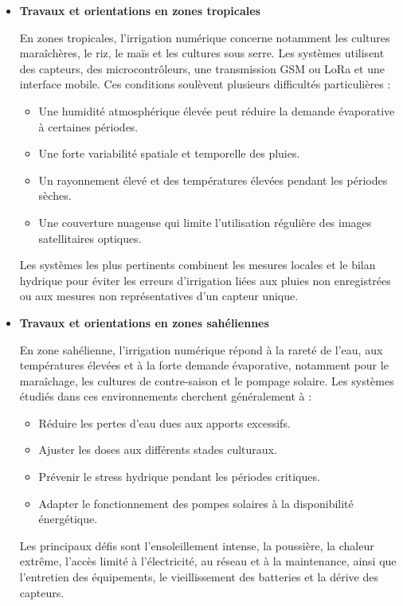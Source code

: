 \begin{itemize}[label=$\bullet$]
   	\item \textbf{Travaux et orientations en zones tropicales}

En zones tropicales, l’irrigation numérique concerne notamment les cultures maraîchères, le riz, le maïs et les cultures sous serre. Les systèmes utilisent des capteurs, des microcontrôleurs, une transmission GSM ou LoRa et une interface mobile. Ces conditions soulèvent plusieurs difficultés particulières : 

    \begin{itemize}[label=$\circ$]
  	  \item Une humidité atmosphérique élevée peut réduire la demande évaporative à certaines périodes.
  	
  	  \item Une forte variabilité spatiale et temporelle des pluies.
  	  
      \item Un rayonnement élevé et des températures élevées pendant les périodes sèches.
  	  
      \item Une couverture nuageuse qui limite l’utilisation régulière des images satellitaires optiques.
	\end{itemize}

Les systèmes les plus pertinents combinent les mesures locales et le bilan hydrique pour éviter les erreurs d’irrigation liées aux pluies non enregistrées ou aux mesures non représentatives d’un capteur unique.
\end{itemize}

\begin{itemize}[label=$\bullet$]
   	\item \textbf{Travaux et orientations en zones sahéliennes}

En zone sahélienne, l’irrigation numérique répond à la rareté de l’eau, aux températures élevées et à la forte demande évaporative, notamment pour le maraîchage, les cultures de contre-saison et le pompage solaire. 
Les systèmes étudiés dans ces environnements cherchent généralement à :

    \begin{itemize}[label=$\circ$]
  	    \item Réduire les pertes d’eau dues aux apports excessifs.
  	  
  	    \item Ajuster les doses aux différents stades culturaux.

        \item Prévenir le stress hydrique pendant les périodes critiques.

        \item Adapter le fonctionnement des pompes solaires à la disponibilité énergétique.
    \end{itemize}

Les principaux défis sont l’ensoleillement intense, la poussière, la chaleur extrême, l’accès limité à l’électricité, au réseau et à la maintenance, ainsi que l’entretien des équipements, le vieillissement des batteries et la dérive des capteurs.
\end{itemize}

